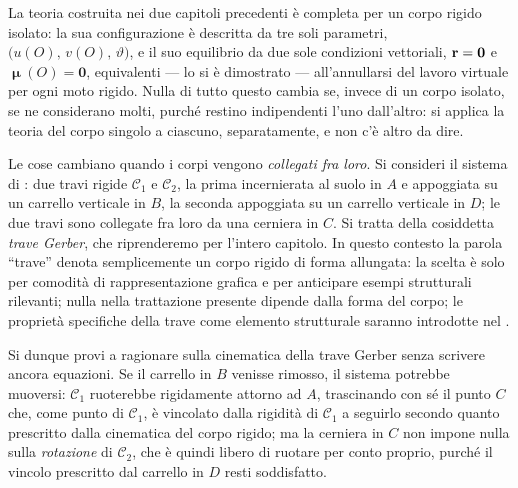 La teoria costruita nei due capitoli precedenti è completa per un corpo
rigido isolato: la sua configurazione è descritta da tre soli parametri,
$\bigl(u(O),\,v(O),\,\vartheta\bigr)$, e il suo equilibrio da due sole
condizioni vettoriali, $\mathbf{r}=\bm{0}$ e $\bm{\upmu}(O)=\bm{0}$, equivalenti
--- lo si è dimostrato --- all'annullarsi del lavoro virtuale per ogni
moto rigido. Nulla di tutto questo cambia se, invece di un corpo isolato,
se ne considerano molti, purché restino indipendenti l'uno dall'altro: si
applica la teoria del corpo singolo a ciascuno, separatamente, e non c'è
altro da dire.

Le cose cambiano quando i corpi vengono \emph{collegati fra loro}. Si
consideri il sistema di : due travi rigide
$\mathcal{C}_1$ e $\mathcal{C}_2$, la prima incernierata al suolo in $A$
e appoggiata su un carrello verticale in $B$, la seconda appoggiata su un
carrello verticale in $D$; le due travi sono collegate fra loro da una
cerniera in $C$. Si tratta della cosiddetta \emph{trave Gerber}, che
riprenderemo per l'intero capitolo. In questo contesto la parola ``trave'' denota semplicemente un corpo rigido di forma allungata: la scelta è solo per comodità di rappresentazione grafica 
e per anticipare  esempi strutturali rilevanti; nulla nella trattazione presente dipende dalla forma del corpo;  le proprietà specifiche della trave come elemento strutturale saranno introdotte nel .





Si dunque provi a ragionare sulla  cinematica della trave Gerber senza scrivere ancora
equazioni. Se il carrello in $B$ venisse rimosso, il sistema potrebbe
muoversi: $\mathcal{C}_1$ ruoterebbe rigidamente attorno ad $A$,
trascinando con sé il punto $C$ che, come punto di $\mathcal{C}_1$, è
vincolato dalla rigidità di $\mathcal{C}_1$ a seguirlo secondo quanto prescritto
dalla cinematica del corpo rigido; ma la
cerniera in $C$ non impone nulla sulla \emph{rotazione} di $\mathcal{C}_2$,
che è quindi libero di ruotare per conto proprio,
purché il vincolo prescritto dal carrello in $D$ resti soddisfatto. 


